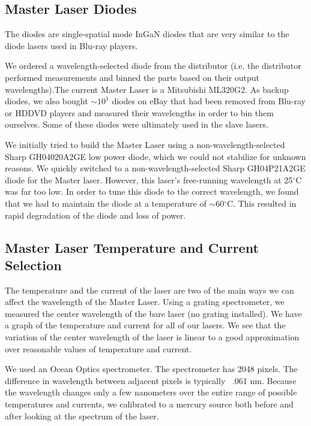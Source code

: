\subsection{Master Laser Diodes}
The diodes are single-spatial mode InGaN diodes that are very similar to the diode lasers used in Blu-ray players. 

We ordered a wavelength-selected diode from the distributor (i.e. the distributor performed measurements and binned the parts based on their output wavelengths).The current Master Laser is a Mitsubishi ML320G2. 
As backup diodes, we also bought $\sim 10^1$ diodes on eBay that had been removed from Blu-ray or HDDVD players and measured their wavelengths in order to bin them ourselves. Some of these diodes were ultimately used in the slave lasers.

We initially tried to build the Master Laser using a non-wavelength-selected Sharp GH04020A2GE low power diode, which we could not stabilize for unknown reasons. We quickly switched to a non-wavelength-selected Sharp GH04P21A2GE diode for the Master laser. However, this laser's free-running wavelength at 25$^\circ$C was far too low. In order to tune this diode to the correct wavelength, we found that we had to maintain the diode at a temperature of $\sim$60$^\circ$C. This resulted in rapid degradation of the diode and loss of power. 



\subsection{Master Laser Temperature and Current Selection}

The temperature and the current of the laser are two of the main ways we can affect the wavelength of the Master Laser. Using a grating spectrometer, we measured the center wavelength of the bare laser (no grating installed). We have a graph of the temperature and current for all of our lasers. We see that the variation of the center wavelength of the laser is linear to a good approximation over reasonable values of temperature and current.

We used an Ocean Optics spectrometer. The spectrometer has 2048 pixels. The difference in wavelength between adjacent pixels is typically ~.061 nm. %
Because the wavelength changes only a few nanometers over the entire range of possible temperatures and currents, we calibrated to a mercury source both before and after looking at the spectrum of the laser. 


